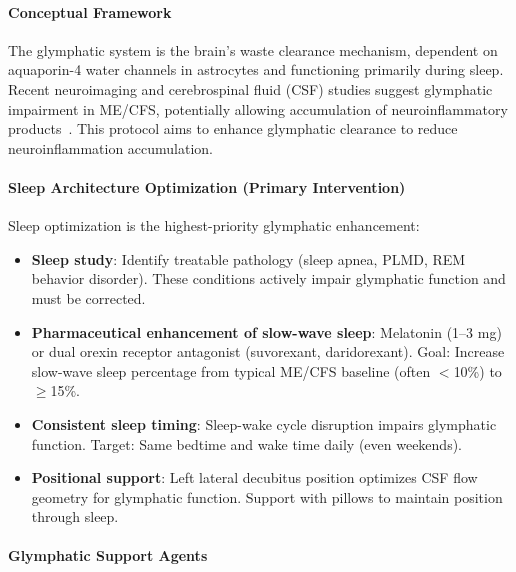 \begin{protocol}
\label{prot:glymphatic-enhancement}

\paragraph{Conceptual Framework}

The glymphatic system is the brain's waste clearance mechanism, dependent on aquaporin-4 water channels in astrocytes and functioning primarily during sleep. Recent neuroimaging and cerebrospinal fluid (CSF) studies suggest glymphatic impairment in ME/CFS, potentially allowing accumulation of neuroinflammatory products~\cite{MCMC2024Neurometabolic}. This protocol aims to enhance glymphatic clearance to reduce neuroinflammation accumulation.

\paragraph{Sleep Architecture Optimization (Primary Intervention)}

Sleep optimization is the highest-priority glymphatic enhancement:
\begin{itemize}
    \item \textbf{Sleep study}: Identify treatable pathology (sleep apnea, PLMD, REM behavior disorder). These conditions actively impair glymphatic function and must be corrected.

    \item \textbf{Pharmaceutical enhancement of slow-wave sleep}: Melatonin (1--3 mg) or dual orexin receptor antagonist (suvorexant, daridorexant). Goal: Increase slow-wave sleep percentage from typical ME/CFS baseline (often $<$10\%) to $\geq$15\%.

    \item \textbf{Consistent sleep timing}: Sleep-wake cycle disruption impairs glymphatic function. Target: Same bedtime and wake time daily (even weekends).

    \item \textbf{Positional support}: Left lateral decubitus position optimizes CSF flow geometry for glymphatic function. Support with pillows to maintain position through sleep.
\end{itemize}

\paragraph{Glymphatic Support Agents}


\end{protocol}
